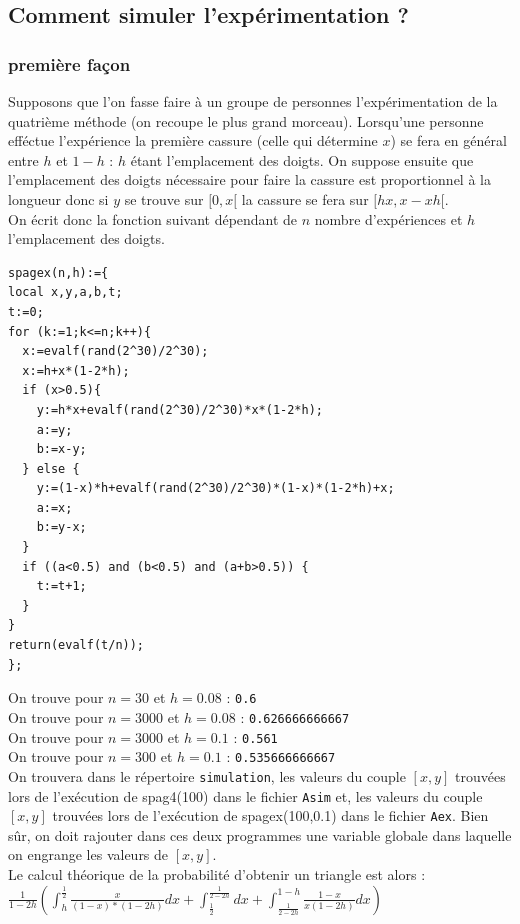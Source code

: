 \documentclass[a4paper,11pt]{book}
\begin{document}
\subsection{Comment simuler l'exp\'erimentation ?}
\subsubsection{premi\`ere fa\c{c}on}
Supposons que l'on fasse faire \`a un groupe de personnes l'exp\'erimentation 
de la quatri\`eme m\'ethode (on recoupe le plus grand morceau). 
Lorsqu'une personne  eff\'ectue l'exp\'erience la
premi\`ere cassure (celle qui d\'etermine $x$) se fera en g\'en\'eral entre 
$h$ et $1-h$ : $h$ \'etant l'emplacement des doigts. On suppose ensuite que
l'emplacement des doigts n\'ecessaire pour faire la cassure est proportionnel
\`a la longueur donc si $y$ se trouve sur $[0,x[$ la cassure se fera sur
$[hx,x-xh[$. \\
On \'ecrit donc la fonction suivant d\'ependant de $n$ nombre 
d'exp\'eriences et $h$ l'emplacement des doigts.
\begin{verbatim}
spagex(n,h):={
local x,y,a,b,t;
t:=0;
for (k:=1;k<=n;k++){
  x:=evalf(rand(2^30)/2^30);
  x:=h+x*(1-2*h);
  if (x>0.5){
    y:=h*x+evalf(rand(2^30)/2^30)*x*(1-2*h);
    a:=y;
    b:=x-y;
  } else {
    y:=(1-x)*h+evalf(rand(2^30)/2^30)*(1-x)*(1-2*h)+x;
    a:=x;
    b:=y-x;
  }
  if ((a<0.5) and (b<0.5) and (a+b>0.5)) {
    t:=t+1;
  }
}
return(evalf(t/n));
};
\end{verbatim}
On trouve  pour $n=30$ et $h=0.08$ :
{\tt 0.6}\\
On trouve  pour $n=3000$ et $h=0.08$ :
{\tt  0.626666666667}\\
On trouve  pour $n=3000$ et $h=0.1$ :
{\tt 0.561}\\
On trouve  pour $n=300$ et $h=0.1$ :
{\tt 0.535666666667}\\
On trouvera dans le r\'epertoire {\tt simulation}, les valeurs du couple 
$[x,y]$ trouv\'ees lors de l'ex\'ecution de {spag4(100)} dans le fichier 
{\tt Asim} et, les valeurs du couple $[x,y]$ trouv\'ees lors de l'ex\'ecution 
de {spagex(100,0.1)} dans le fichier {\tt Aex}. Bien s\^ur, on doit rajouter
 dans ces deux programmes une variable globale dans laquelle on engrange les 
valeurs de $[x,y]$.\\
Le calcul th\'eorique de la probabilit\'e d'obtenir un triangle est alors :\\
$\displaystyle \frac{1}{1-2h} (\int_h^{\frac{1}{2}} \frac{x}{(1-x)*(1-2h)}dx+\int_{\frac{1}{2}}^{\frac{1}{2-2h}} dx+\int_{\frac{1}{2-2h}}^{1-h}\frac{1-x}{x(1-2h)}dx)$\\
\end{document}
